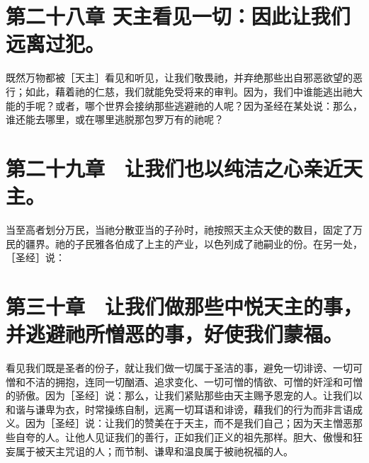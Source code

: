 
\section{第二十八章 天主看见一切：因此让我们远离过犯。}

既然万物都被［天主］看见和听见，让我们敬畏祂，并弃绝那些出自邪恶欲望的恶行；如此，藉着祂的仁慈，我们就能免受将来的审判。因为，我们中谁能逃出祂大能的手呢？或者，哪个世界会接纳那些逃避祂的人呢？因为圣经在某处说：那么，谁还能去哪里，或在哪里逃脱那包罗万有的祂呢？\par


\section{第二十九章　让我们也以纯洁之心亲近天主。}

当至高者划分万民，当祂分散亚当的子孙时，祂按照天主众天使的数目，固定了万民的疆界。祂的子民雅各伯成了上主的产业，以色列成了祂嗣业的份。在另一处，［圣经］说：\par


\section{第三十章　让我们做那些中悦天主的事，并逃避祂所憎恶的事，好使我们蒙福。}

看见我们既是圣者的份子，就让我们做一切属于圣洁的事，避免一切诽谤、一切可憎和不洁的拥抱，连同一切酗酒、追求变化、一切可憎的情欲、可憎的奸淫和可憎的骄傲。因为［圣经］说：那么，让我们紧贴那些由天主赐予恩宠的人。让我们以和谐与谦卑为衣，时常操练自制，远离一切耳语和诽谤，藉我们的行为而非言语成义。因为［圣经］说：让我们的赞美在于天主，而不是我们自己；因为天主憎恶那些自夸的人。让他人见证我们的善行，正如我们正义的祖先那样。胆大、傲慢和狂妄属于被天主咒诅的人；而节制、谦卑和温良属于被祂祝福的人。\par


